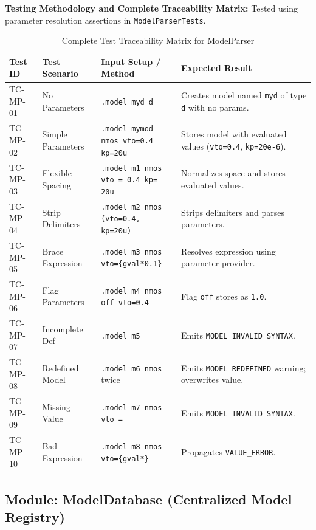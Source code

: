 \textbf{Testing Methodology and Complete Traceability Matrix:} Tested using parameter resolution assertions in \texttt{ModelParserTests}.

\begin{table}[H]
\centering
\small
\begin{tabular}{|l|l|p{4.5cm}|p{4.5cm}|}
\hline
\textbf{Test ID} & \textbf{Test Scenario} & \textbf{Input Setup / Method} & \textbf{Expected Result} \\
\hline
TC-MP-01 & No Parameters & \texttt{.model myd d} & Creates model named \texttt{myd} of type \texttt{d} with no params. \\
\hline
TC-MP-02 & Simple Parameters & \texttt{.model mymod nmos vto=0.4 kp=20u} & Stores model with evaluated values (\texttt{vto=0.4}, \texttt{kp=20e-6}). \\
\hline
TC-MP-03 & Flexible Spacing & \texttt{.model m1 nmos vto = 0.4 kp= 20u} & Normalizes space and stores evaluated values. \\
\hline
TC-MP-04 & Strip Delimiters & \texttt{.model m2 nmos (vto=0.4, kp=20u)} & Strips delimiters and parses parameters. \\
\hline
TC-MP-05 & Brace Expression & \texttt{.model m3 nmos vto=\{gval*0.1\}} & Resolves expression using parameter provider. \\
\hline
TC-MP-06 & Flag Parameters & \texttt{.model m4 nmos off vto=0.4} & Flag \texttt{off} stores as \texttt{1.0}. \\
\hline
TC-MP-07 & Incomplete Def & \texttt{.model m5} & Emits \texttt{MODEL\_INVALID\_SYNTAX}. \\
\hline
TC-MP-08 & Redefined Model & \texttt{.model m6 nmos} twice & Emits \texttt{MODEL\_REDEFINED} warning; overwrites value. \\
\hline
TC-MP-09 & Missing Value & \texttt{.model m7 nmos vto =} & Emits \texttt{MODEL\_INVALID\_SYNTAX}. \\
\hline
TC-MP-10 & Bad Expression & \texttt{.model m8 nmos vto=\{gval*\}} & Propagates \texttt{VALUE\_ERROR}. \\
\hline
\end{tabular}
\caption{Complete Test Traceability Matrix for ModelParser}
\end{table}


\subsection{Module: ModelDatabase (Centralized Model Registry)}

